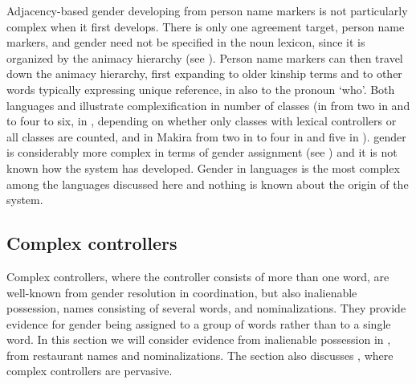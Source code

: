 \documentclass[output=collectionpaper]{langsci/langscibook}
\begin{document}
Adjacency-based gender developing from person name markers is not particularly complex when it first develops. There is only one agreement target, person name markers, and gender need not be specified in the noun lexicon, since it is organized by the animacy hierarchy (see ). Person name markers can then travel down the animacy hierarchy, first expanding to older kinship terms and to other words typically expressing unique reference, in  also to the pronoun `who'. Both  languages and  illustrate complexification in number of classes (in  from two in  and  to four to six, in , depending on whether only classes with lexical controllers or all classes are counted, and in Makira from two in  to four in  and five in ).  gender is considerably more complex in terms of gender assignment (see ) and it is not known how the system has developed. Gender in  languages is the most complex among the languages discussed here and nothing is known about the origin of the system.

  \subsection{Complex controllers}
\label{sec:WDG:7.3}

Complex controllers, where the controller consists of more than one word, are well-known from gender resolution in coordination, but also inalienable possession, names consisting of several words, and nominalizations. They provide evidence for gender being assigned to a group of words rather than to a single word. In this section we will consider evidence from inalienable possession in , from  restaurant names and  nominalizations. The section also discusses , where complex controllers are pervasive.
\end{document}
